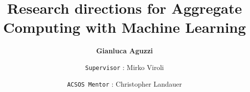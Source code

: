 \title{Research directions for Aggregate Computing with
Machine Learning}
\author[G. Aguzzi]{
  \textbf{Gianluca Aguzzi} \and
  \texttt{Supervisor} : Mirko Viroli  \and
  \texttt{ACSOS Mentor} : Christopher Landauer
}
